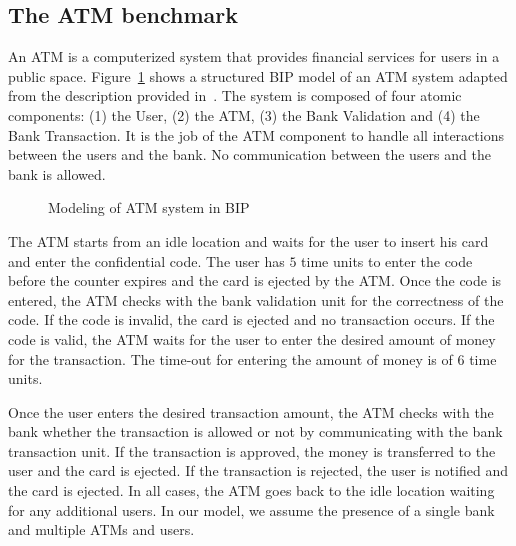 \subsection{The ATM benchmark}
An ATM is a computerized system that provides financial services for users in 
a public space. 
Figure~\ref{fig:atm_bip} shows a structured BIP model of an ATM system adapted from the
description provided in~\cite{atm}.
The system is composed of four atomic components: (1) the User, (2) the ATM, (3) the Bank Validation 
and (4) the Bank Transaction. It is the job of the ATM component to handle all interactions between the 
users and the bank. No communication between the users and the bank is allowed. 
\begin{figure}[bt]
 \centering
  \resizebox{1.0\textwidth}{!}{
       
  }
  \caption{Modeling of ATM system in BIP} \vspace*{-0.5cm}
  \label{fig:atm_bip}
\end{figure}

The ATM starts from an idle location and waits for the user to insert his card 
and enter the confidential code. The user has $5$ time units
to enter the code before the counter expires and the card is ejected by the ATM. 
Once the code is entered, the ATM checks with the bank validation unit for 
the correctness of the code. If the code is invalid, the card is ejected
and no transaction occurs. If the code is valid, the ATM waits for the user to enter
the desired amount of money for the transaction. The time-out for entering the amount 
of money is of $6$ time units. 

Once the user enters the desired transaction amount, the ATM checks with the bank whether 
the transaction is allowed or not by communicating with the bank transaction unit.
If the transaction is approved, the money is transferred to the user and the card is ejected. 
If the transaction is rejected, the user is notified and the card is ejected. In all cases, 
the ATM goes back to the idle location waiting for any additional users. 
In our model, we assume the presence of a single bank and multiple ATMs and users. 

